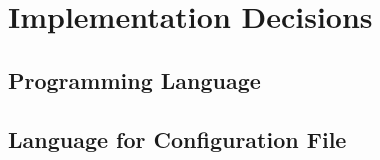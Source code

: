 \chapter{Implementation Decisions}
\label{sec:decisions}

\section{Programming Language}
\label{sec:decisions:language}

\section{Language for Configuration File}
\label{sec:decisions:config:language}
